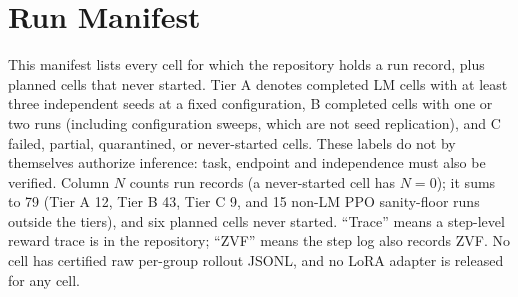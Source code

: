 \section{Run Manifest}
\label{sec:run-manifest}

This manifest lists every cell for which the repository holds a run
record, plus planned cells that never started. Tier A denotes completed LM
cells with at least three independent seeds at a fixed configuration, B completed
cells with one or two runs (including configuration sweeps, which are not
seed replication), and C failed, partial, quarantined, or never-started
cells. These labels do not by themselves authorize inference: task, endpoint
and independence must also be verified. Column $N$ counts run records (a
never-started cell has $N{=}0$); it sums to 79 (Tier A 12, Tier B 43,
Tier C 9, and 15 non-LM PPO sanity-floor runs outside the tiers), and six
planned cells never started. ``Trace'' means a
step-level reward trace is in the repository; ``ZVF'' means the step log also
records ZVF. No cell has certified raw per-group rollout JSONL, and no
LoRA adapter is released for any cell.

